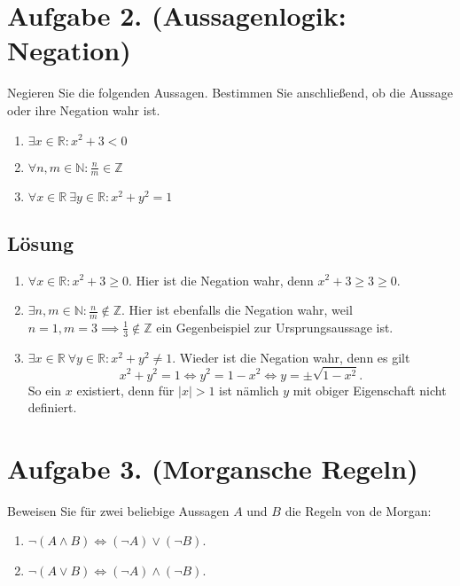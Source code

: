 \documentclass[german,12pt]{homework}
\newcommand{\ZZ}{\mathbb{Z}}
\begin{document}
    \section*{Aufgabe 2. (Aussagenlogik: Negation)}

    \begin{problem}
        Negieren Sie die folgenden Aussagen. Bestimmen Sie anschließend, ob die
        Aussage oder ihre Negation wahr ist.
        \begin{enumerate}
            \item \({\exists}x \in \mathbb{R}: x^2 + 3 < 0\)
            \item \({\forall}n, m \in \mathbb{N}: \frac{n}{m} \in \ZZ\)
            \item \({\forall}x \in \mathbb{R}\ {\exists}y \in \mathbb{R}: x^2 +
            y^2 = 1\)
        \end{enumerate}
    \end{problem}

    \subsection*{Lösung}
    \begin{enumerate}
        \item \({\forall}x \in \mathbb{R}: x^2 + 3 \ge 0\). Hier ist die
        Negation wahr, denn \(x^2 + 3 \ge 3 \ge 0\).
        \item \({\exists}n, m \in \mathbb{N}: \frac{n}{m} \not\in \ZZ\).
        Hier ist ebenfalls die Negation wahr, weil \(n = 1, m = 3 \implies
        \frac{1}{3} \not\in \ZZ\) ein Gegenbeispiel zur Ursprungsaussage
        ist.
        \item \({\exists}x \in \mathbb{R}\ {\forall}y \in \mathbb{R}: x^2 + y^2
        \ne 1\). Wieder ist die Negation wahr, denn es gilt
        \[x^2 + y^2 = 1 \iff y^2 = 1 - x^2 \iff y = \pm\sqrt{1 - x^2}.\]
        So ein \(x\) existiert, denn für \(\left|x\right| > 1\) ist nämlich
        \(y\) mit obiger Eigenschaft nicht definiert.
    \end{enumerate}

    \section*{Aufgabe 3. (Morgansche Regeln)}

    \begin{problem}
        Beweisen Sie für zwei beliebige Aussagen \(A\) und \(B\) die Regeln von
        de Morgan:
        \begin{enumerate}
            \item \({\lnot}\left(A \land B\right) \iff \left({\lnot}A\right)
            \lor \left({\lnot}B\right)\).
            \item \({\lnot}\left(A \lor B\right) \iff \left({\lnot}A\right)
            \land \left({\lnot}B\right)\).
        \end{enumerate}
    \end{problem}
\end{document}
